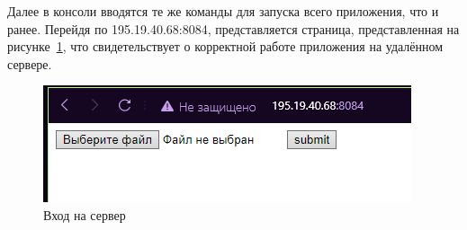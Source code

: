 Далее в консоли вводятся те же команды для запуска всего приложения, что и ранее. Перейдя по 195.19.40.68:8084, представляется страница, представленная на рисунке~\ref{rndhpcgui.2022.12.07.picture2}, что свидетельствует о корректной работе приложения на удалённом сервере.
\begin{figure}[!ht]
  \centering
  \includegraphics[scale=0.8]{ResearchNotes/rndhpc_dev_gui_2022_12_07/rndhpcgui.2022.12.07.picture2.png}
  \caption{Вход на сервер}
  \label{rndhpcgui.2022.12.07.picture2}
\end{figure}

\noteattributes{}

